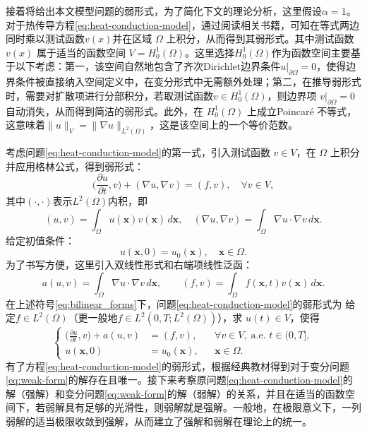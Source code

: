 \documentclass{GZUbachelorthesis}
\theoremstyle{chineseplain}
\begin{document}
接着将给出本文模型问题的弱形式，为了简化下文的理论分析，这里假设$\alpha=1$。对于热传导方程\eqref{eq:heat-conduction-model}，通过阅读相关书籍\cite{李荣华2010偏微分方程数值解法}，可知在等式两边同时乘以测试函数$v(x)$并在区域 $\Omega$ 上积分，从而得到其弱形式。其中测试函数 $v(x)$ 属于适当的函数空间 $V=H^1_0(\Omega)$。这里选择$H_0^1(\Omega)$作为函数空间主要基于以下考虑：第一，该空间自然地包含了齐次Dirichlet边界条件$u|_{\partial\Omega}=0$，使得边界条件被直接纳入空间定义中，在变分形式中无需额外处理；第二，在推导弱形式时，需要对扩散项进行分部积分，若取测试函数$v \in H_0^1(\Omega)$，则边界项 $v|_{\partial\Omega}=0$ 自动消失，从而得到简洁的弱形式。此外，在 $H_0^1(\Omega)$ 上成立Poincaré 不等式，这意味着$\|u\|_V = \|\nabla u\|_{L^2(\Omega)}$，这是该空间上的一个等价范数。

考虑问题\eqref{eq:heat-conduction-model}的第一式，引入测试函数 $v \in V$，在 $\Omega$ 上积分并应用格林公式，得到弱形式：
\[
\biggl( \frac{\partial u}{\partial t}, v \biggr) + (\nabla u, \nabla v) = (f, v), \quad \forall v \in V,
\]
其中$(\cdot,\cdot)$表示$L^2(\Omega)$内积，即
\[
(u,v) = \int_{\Omega} u(\boldsymbol{x}) v(\boldsymbol{x}) \, d\boldsymbol{x}, \quad 
(\nabla u, \nabla v) = \int_{\Omega} \nabla u \cdot \nabla v \, d\boldsymbol{x}.
\]
给定初值条件：
\[
u(\boldsymbol{x},0) = u_0(\boldsymbol{x}), \quad \boldsymbol{x} \in \Omega.
\]
为了书写方便，这里引入双线性形式和右端项线性泛函：
\begin{equation}
	a(u,v) = \int_{\Omega} \nabla u \cdot \nabla v \, d\boldsymbol{x}, \qquad
	(f,v) = \int_{\Omega} f(\boldsymbol{x},t) v(\boldsymbol{x}) \, d\boldsymbol{x}.
	\label{eq:bilinear_forms}
\end{equation}
在上述符号\eqref{eq:bilinear_forms}下，问题\eqref{eq:heat-conduction-model}的弱形式为
给定$f \in L^2(\Omega)$（更一般地$f \in L^2(0,T; L^2(\Omega))$），求 $u(t) \in V$，使得
\begin{equation}
	\label{eq:weak-form}
	\left\{
	\begin{aligned}
		\biggl( \frac{\partial u}{\partial t}, v \biggr) + a(u,v) &= (f, v), && \forall v \in V, \; \text{a.e. } t \in (0,T], \\[4pt]
		u(\boldsymbol{x},0) &= u_0(\boldsymbol{x}), && \boldsymbol{x} \in \Omega.
	\end{aligned}
	\right.
\end{equation}
有了方程\eqref{eq:heat-conduction-model}的弱形式，根据经典教材得到对于变分问题\eqref{eq:weak-form}的解存在且唯一\cite{evans2010partial}。接下来考察原问题\eqref{eq:heat-conduction-model}的解（强解）和变分问题\eqref{eq:weak-form}的解（弱解）的关系，并且在适当的函数空间下，若弱解具有足够的光滑性，则弱解就是强解\cite{evans2010partial}。一般地，在极限意义下，一列弱解的适当极限收敛到强解，从而建立了强解和弱解在理论上的统一。
\end{document}
